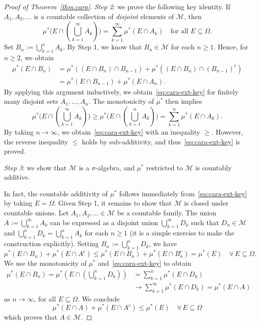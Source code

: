 \begin{proof}[Proof of Theorem~\ref{thm:cara}]
    \emph{Step 2}: we prove the following key identity. If $A_1,A_2,\ldots$ is a countable collection of \emph{disjoint} elements of $\mathcal{M}$, then
    \begin{equation}
    \label{eq:cara-ext-key}
        \mu^*\bigg(E\cap (\bigcup_{k=1}^\infty A_k)\bigg) = \sum_{k=1}^\infty \mu^*(E\cap A_k) \quad\text{for all }E\subseteq\Omega.
    \end{equation}
    Set $B_n := \bigcup_{k=1}^n A_k$. By Step 1, we know that $B_n\in\mathcal{M}$ for each $n\ge 1$. Hence, for $n\ge 2$, we obtain
    \begin{align*}
        \mu^*(E\cap B_n) &= \mu^*((E\cap B_n)\cap B_{n-1}) + \mu^*((E \cap B_n)\cap (B_{n-1})^c) \\
        &= \mu^*(E\cap B_{n-1}) + \mu^*(E\cap A_n).
    \end{align*}
    By applying this argument inductively, we obtain~\eqref{eq:cara-ext-key} for finitely many disjoint sets $A_1,\ldots, A_n$. The monotonicity of $\mu^*$ then implies
    \begin{equation*}
        \mu^*\bigg(E\cap (\bigcup_{k=1}^\infty A_k)\bigg) \ge \mu^*\bigg(E\cap (\bigcup_{k=1}^n A_k)\bigg) = \sum_{k=1}^n \mu^*(E\cap A_k).
    \end{equation*}
    By taking $n\to\infty$, we obtain~\eqref{eq:cara-ext-key} with an inequality $\ge$. However, the reverse inequality $\le$ holds by sub-additivity, and thus~\eqref{eq:cara-ext-key} is proved.

    \emph{Step 3}: we show that $\mathcal{M}$ is a $\sigma$-algebra, and $\mu^*$ restricted to $\mathcal{M}$ is countably additive.

    In fact, the countable additivity of $\mu^*$ follows immediately from~\eqref{eq:cara-ext-key} by taking $E=\Omega$. Given Step 1, it remains to show that $\mathcal{M}$ is closed under countable unions. Let $A_1,A_2,\ldots\in\mathcal{M}$ be a countable family. The union $A:=\bigcup_{k=1}^\infty A_k$ can be expressed as a disjoint union $\bigcup_{k=1}^\infty D_k$ such that $D_n\in\mathcal{M}$ and $\bigcup_{k=1}^n D_k = \bigcup_{k=1}^n A_k$ for each $n\ge 1$ (it is a simple exercise to make the construction explicitly). Setting $B_n:=\bigcup_{k=1}^n D_k$, we have
    \begin{equation*}
        \mu^*(E\cap B_n)+\mu^*(E\cap A^c)\le \mu^*(E\cap B_n)+\mu^*(E\cap B_n^c) = \mu^*(E) \quad\forall\, E\subseteq\Omega.
    \end{equation*}
    We use the monotonicity of $\mu^*$ and~\eqref{eq:cara-ext-key} to obtain
    \begin{align*}
    \mu^*(E\cap B_n) = \mu^*(E\cap (\bigcup_{k=1}^n D_k) ) &= \sum_{k=1}^n \mu^*(E\cap D_k) \\
    &\longrightarrow \sum_{k=1}^\infty \mu^*(E\cap D_k) = \mu^*(E\cap A)
    \end{align*}
    as $n\to\infty$, for all $E\subseteq\Omega$. We conclude
    \begin{equation*}
        \mu^*(E\cap A)+\mu^*(E\cap A^c)\le \mu^*(E) \quad\forall\, E\subseteq\Omega
    \end{equation*}
    which proves that $A\in\mathcal{M}$.


\end{proof}
